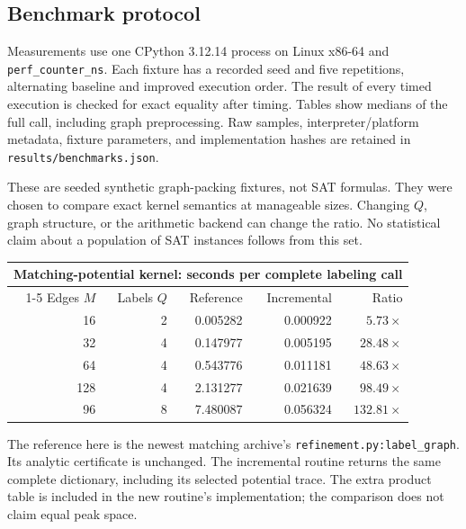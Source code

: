 \subsection{Benchmark protocol}
Measurements use one CPython 3.12.14 process on Linux x86-64 and
\texttt{perf\_counter\_ns}. Each fixture has a recorded seed and five
repetitions, alternating baseline and improved execution order. The result of
every timed execution is checked for exact equality after timing. Tables show
medians of the full call, including graph preprocessing. Raw samples,
interpreter/platform metadata, fixture parameters, and implementation hashes
are retained in \texttt{results/benchmarks.json}.

These are seeded synthetic graph-packing fixtures, not SAT formulas. They
were chosen to compare exact kernel semantics at manageable sizes. Changing
$Q$, graph structure, or the arithmetic backend can change the ratio. No
statistical claim about a population of SAT instances follows from this set.

\begin{center}
\begin{tabular}{@{}rrrrr@{}}
\toprule
\multicolumn{5}{c}{Matching-potential kernel: seconds per complete labeling call}\\
\cmidrule(lr){1-5}
Edges $M$ & Labels $Q$ & Reference & Incremental & Ratio\\
\midrule
16  & 2 & 0.005282 & 0.000922 & $5.73\times$\\
32  & 4 & 0.147977 & 0.005195 & $28.48\times$\\
64  & 4 & 0.543776 & 0.011181 & $48.63\times$\\
128 & 4 & 2.131277 & 0.021639 & $98.49\times$\\
96  & 8 & 7.480087 & 0.056324 & $132.81\times$\\
\bottomrule
\end{tabular}
\end{center}
The reference here is the newest matching archive's
\texttt{refinement.py:label\_graph}. Its analytic certificate is unchanged.
The incremental routine returns the same complete dictionary, including its
selected potential trace. The extra product table is included in the new
routine's implementation; the comparison does not claim equal peak space.

